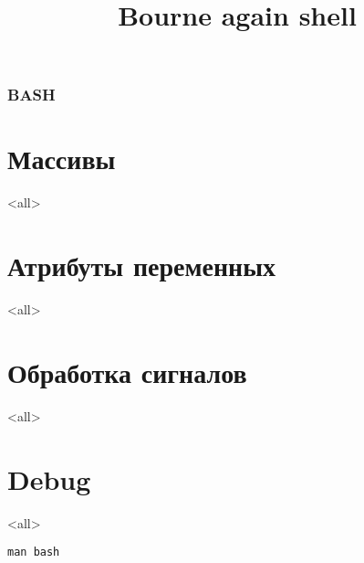 
\title[bash]{Bourne again shell}




\begin{frame}
	\frametitle{BASH}
	\titlepage
	\vspace{-0.5cm}
	\begin{center}
	\end{center}
\end{frame}

\begin{frame}
	\tableofcontents
\end{frame}





\section{Массивы}

\mode<all>{}

\section{Атрибуты переменных}
\mode<all>{}

\section{Обработка сигналов}
\mode<all>{}

\section{Debug}
\mode<all>{}


\begin{frame}{}
\Huge
\begin{center}
	{\tt man bash}
\end{center}
\end{frame}


